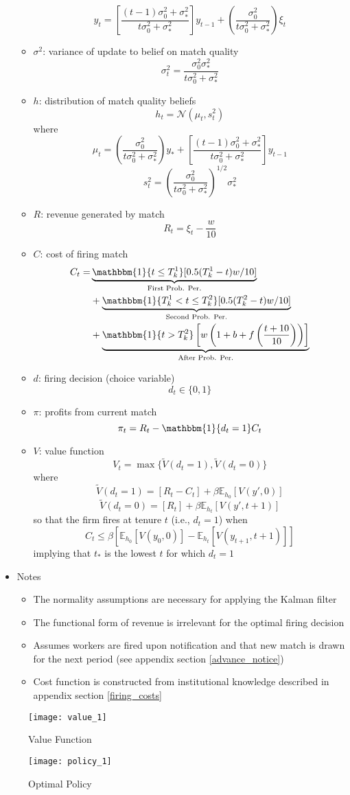 \documentclass[12pt]{article}
\begin{document}
\begin{itemize}
\begin{itemize}
$$y_t=\left[\frac{(t-1)\sigma^2_0+\sigma^2_*}{t\sigma^2_0+\sigma^2_*}\right]y_{t-1}+\left(\frac{\sigma^2_0}{t\sigma^2_0+\sigma^2_*}\right)\xi_t$$
\item $\sigma^2$: variance of update to belief on match quality
$$\sigma^2_t=\frac{\sigma^2_0\sigma^2_*}{t\sigma^2_0+\sigma^2_*}$$
\item $h$: distribution of match quality beliefs
$$h_t=\mathcal{N}\left(\mu_t,s^2_t\right)$$
where
$$\mu_t=\left(\frac{\sigma^2_0}{t\sigma^2_0+\sigma^2_*}\right)y_*+\left[\frac{(t-1)\sigma^2_0+\sigma^2_*}{t\sigma^2_0+\sigma^2_*}\right]y_{t-1}$$
$$s^2_t=\left(\frac{\sigma^2_0}{t\sigma^2_0+\sigma^2_*}\right)^{1/2}\sigma^2_*$$
\item $R$: revenue generated by match
$$R_t=\xi_t-\frac{w}{10}$$
\item $C$: cost of firing match
\begin{equation} \nonumber
 \begin{split}
  C_t =& \underbrace{\mathbbm{1}\{t\le T_k^1\}[0.5(T_k^1-t)w/10]}_{\text{First Prob. Per.}} \\
& + \underbrace{\mathbbm{1}\{T_k^1 < t\le T_k^2\}[0.5(T_k^2-t)w/10]}_{\text{Second Prob. Per.}} \\
& + \underbrace{\mathbbm{1}\{t> T_k^2\}\left[w\left(1+b+f\left(\frac{t+10}{10}\right)\right)\right]}_{\text{After Prob. Per.}} 
 \end{split}
\end{equation}
\item $d$: firing decision (choice variable)
$$d_t\in\{0,1\}$$
\item $\pi$: profits from current match
$$\pi_t=R_t-\mathbbm{1}\{d_t=1\}C_t$$
\item $V$: value function
$$V_t=\max\{\tilde{V}(d_t=1),\tilde{V}(d_t=0)\}$$
where
$$\tilde{V}(d_t=1)=[R_t-C_t]+\beta\mathbb{E}_{h_0}[V(y',0)]$$
$$\tilde{V}(d_t=0)=[R_t]+\beta\mathbb{E}_{h_t}[V(y',t+1)]$$
so that the firm fires at tenure $t$ (i.e., $d_t=1$) when
$$C_t\le\beta[\mathbb{E}_{h_0}[V(y_{0},0)]-\mathbb{E}_{h_t}[V(y_{t+1},t+1)]]$$
implying that $t_*$ is the lowest $t$ for which $d_t=1$
\end{itemize}
\item Notes
\begin{itemize}
\item The normality assumptions are necessary for applying the Kalman filter
\item The functional form of revenue is irrelevant for the optimal firing decision
\item Assumes workers are fired upon notification and that new match is drawn for the next period (see appendix section \ref{advance_notice})
\item Cost function is constructed from institutional knowledge described in appendix section \ref{firing_costs}
\end{itemize}
\end{itemize}

\newpage

\begin{figure}[h!]
  \centering
  \texttt{[image: value\_1]}
  \caption{Value Function}
  \label{fig:value_1}
\end{figure}

\begin{figure}[h!]
  \centering
  \texttt{[image: policy\_1]}
  \caption{Optimal Policy}
  \label{fig:policy_1}
\end{figure}
\end{document}
